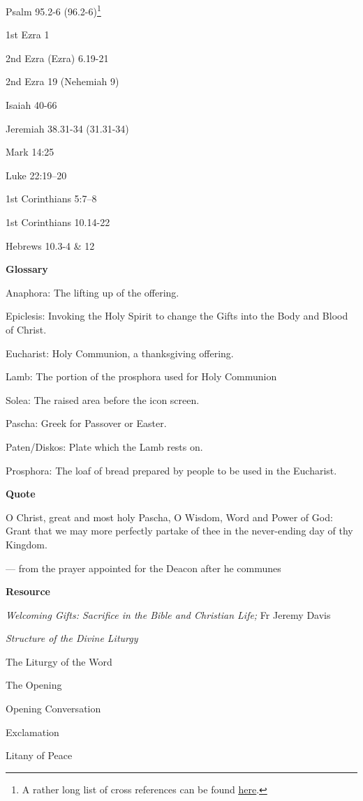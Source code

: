 \documentclass[
]{article}
\begin{document}
Psalm 95.2-6 (96.2-6)\footnote{A rather long list of cross references
  can be found
  \href{http://jimmyakin.com/deuterocanonical-references-in-the-new-testament}{\ul{here}}.}

1st Ezra 1

2nd Ezra (Ezra) 6.19-21

2nd Ezra 19 (Nehemiah 9)

Isaiah 40-66

Jeremiah 38.31-34 (31.31-34)

Mark 14:25

Luke 22:19--20

1st Corinthians 5:7--8

1st Corinthians 10.14-22

Hebrews 10.3-4 \& 12

\textbf{Glossary}

Anaphora: The lifting up of the offering.

Epiclesis: Invoking the Holy Spirit to change the Gifts into the Body
and Blood of Christ.

Eucharist: Holy Communion, a thanksgiving offering.

Lamb: The portion of the prosphora used for Holy Communion

Solea: The raised area before the icon screen.

Pascha: Greek for Passover or Easter.

Paten/Diskos: Plate which the Lamb rests on.

Prosphora: The loaf of bread prepared by people to be used in the
Eucharist.

\textbf{Quote}

O Christ, great and most holy Pascha, O Wisdom, Word and Power of God:
Grant that we may more perfectly partake of thee in the never-ending day
of thy Kingdom.

--- from the prayer appointed for the Deacon after he communes

\textbf{Resource}

\emph{Welcoming Gifts: Sacrifice in the Bible and Christian Life;} Fr
Jeremy Davis

\emph{Structure of the Divine Liturgy}

The Liturgy of the Word

The Opening

Opening Conversation

Exclamation

Litany of Peace
\end{document}

